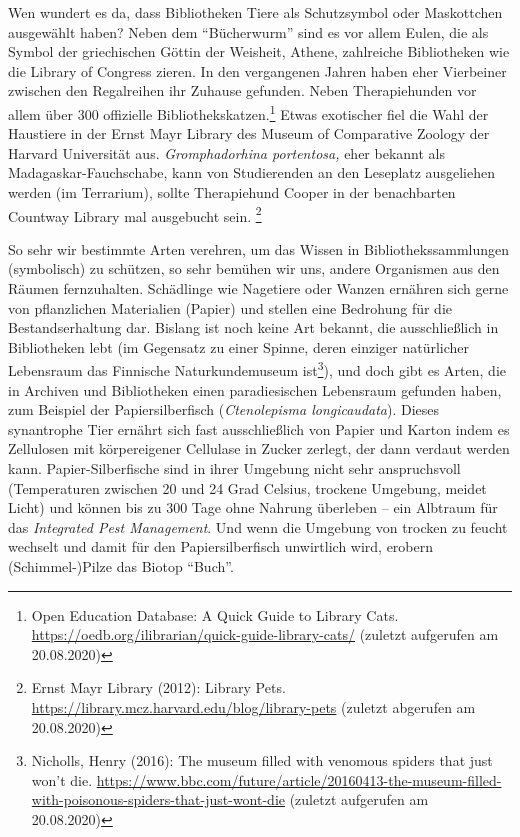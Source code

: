 \documentclass[a4paper,
fontsize=11pt,
oneside,
numbers=noperiodatend,
parskip=half-,
bibliography=totoc,
final
]{scrartcl}
\begin{document}
Wen wundert es da, dass Bibliotheken Tiere als Schutzsymbol oder
Maskottchen ausgewählt haben? Neben dem \enquote{Bücherwurm} sind es vor
allem Eulen, die als Symbol der griechischen Göttin der Weisheit,
Athene, zahlreiche Bibliotheken wie die Library of Congress zieren. In
den vergangenen Jahren haben eher Vierbeiner zwischen den Regalreihen
ihr Zuhause gefunden. Neben Therapiehunden vor allem über 300 offizielle
Bibliothekskatzen.\footnote{Open Education Database: A Quick Guide to
  Library Cats.
  \url{https://oedb.org/ilibrarian/quick-guide-library-cats/} (zuletzt
  aufgerufen am 20.08.2020)} Etwas exotischer fiel die Wahl der
Haustiere in der Ernst Mayr Library des Museum of Comparative Zoology
der Harvard Universität aus. \emph{Gromphadorhina portentosa,} eher
bekannt als Madagaskar-Fauchschabe, kann von Studierenden an den
Leseplatz ausgeliehen werden (im Terrarium), sollte Therapiehund Cooper
in der benachbarten Countway Library mal ausgebucht sein. \footnote{Ernst
  Mayr Library (2012): Library Pets.
  \url{https://library.mcz.harvard.edu/blog/library-pets} (zuletzt
  abgerufen am 20.08.2020)}

So sehr wir bestimmte Arten verehren, um das Wissen in
Bibliothekssammlungen (symbolisch) zu schützen, so sehr bemühen wir uns,
andere Organismen aus den Räumen fernzuhalten. Schädlinge wie Nagetiere
oder Wanzen ernähren sich gerne von pflanzlichen Materialien (Papier)
und stellen eine Bedrohung für die Bestandserhaltung dar. Bislang ist
noch keine Art bekannt, die ausschließlich in Bibliotheken lebt (im
Gegensatz zu einer Spinne, deren einziger natürlicher Lebensraum das
Finnische Naturkundemuseum ist\footnote{Nicholls, Henry (2016): The
  museum filled with venomous spiders that just won't die.
  \url{https://www.bbc.com/future/article/20160413-the-museum-filled-with-poisonous-spiders-that-just-wont-die}
  (zuletzt aufgerufen am 20.08.2020)}), und doch gibt es Arten, die in
Archiven und Bibliotheken einen paradiesischen Lebensraum gefunden
haben, zum Beispiel der Papiersilberfisch (\emph{Ctenolepisma
longicaudata}). Dieses synantrophe Tier ernährt sich fast ausschließlich
von Papier und Karton indem es Zellulosen mit körpereigener Cellulase in
Zucker zerlegt, der dann verdaut werden kann. Papier-Silberfische sind
in ihrer Umgebung nicht sehr anspruchsvoll (Temperaturen zwischen 20 und
24 Grad Celsius, trockene Umgebung, meidet Licht) und können bis zu 300
Tage ohne Nahrung überleben -- ein Albtraum für das \emph{Integrated
Pest Management}. Und wenn die Umgebung von trocken zu feucht wechselt
und damit für den Papiersilberfisch unwirtlich wird, erobern
(Schimmel-)Pilze das Biotop \enquote{Buch}.
\end{document}
